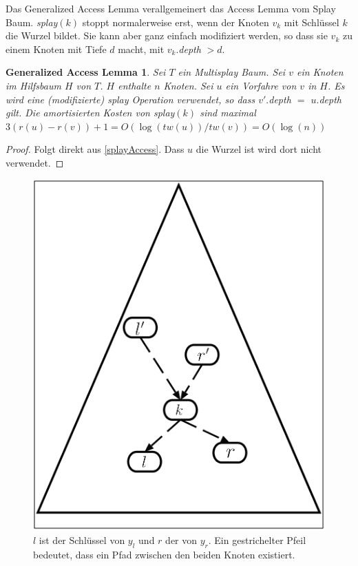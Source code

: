 \documentclass[a4paper,12pt]{article}
\begin{document}
\noindent Das Generalized Access Lemma verallgemeinert das Access Lemma vom Splay Baum. \textit{splay}$\left(k\right)$ stoppt normalerweise erst, wenn der Knoten $v_k$ mit Schlüssel $k$ die Wurzel bildet. Sie kann aber ganz einfach modifiziert werden, so dass sie $v_k$ zu einem Knoten mit Tiefe $d$ macht, mit $v_k.$\textit{depth} $> d $.

\newtheorem{Generalized Access Lemma}{Generalized Access Lemma}[section] 
\begin{Generalized Access Lemma}Sei $T$ ein Multisplay Baum. Sei $v$ ein Knoten im Hilfsbaum $H$ von $T$. $H$ enthalte $n$ Knoten. Sei $u$ ein Vorfahre von $v$ in $H$. Es wird eine (modifizierte) \textit{splay} Operation verwendet, so dass $v'.$\textit{depth} $=$ $u.$\textit{depth} gilt.  Die amortisierten Kosten von \textit{splay}$\left(k\right)$ sind maximal $3 \left(r\left(u\right) - r\left(v\right)\right) + 1 = O\left(\log\left(\mathit{tw}\left(u\right)\right)  / \mathit{tw}\left(v\right) \right) = O\left(\log\left(n\right)\right)$ \\	
\end{Generalized Access Lemma}
\begin{proof}
	Folgt direkt aus \ref{splayAccess}. Dass $u$ die Wurzel ist wird dort nicht verwendet. 	
	
\end{proof}
\begin{figure}[h]
	\centering
	\includegraphics[height= 0.7\textwidth]{"Medien/Multisplay/lemma"}
	\caption {$l$ ist der Schlüssel von $y_l$ und $r$ der von $y_r$. Ein gestrichelter Pfeil bedeutet, dass ein Pfad zwischen den beiden Knoten existiert.}
	\label{fig:lemma}
\end{figure} 
\newtheorem{Lemma2}{Multisplay Baum Access Lemma}[section] \label{lemmaMultiSplay}
\end{document}
